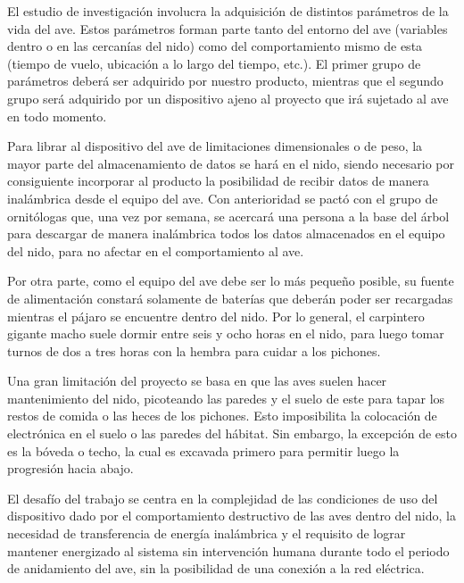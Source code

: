 El estudio de investigación involucra la adquisición de distintos parámetros de la vida del ave. Estos parámetros forman parte tanto del entorno del ave (variables dentro o en las cercanías del nido) como del comportamiento mismo de esta (tiempo de vuelo, ubicación a lo largo del tiempo, etc.). El primer grupo de parámetros deberá ser adquirido por nuestro producto, mientras que el segundo grupo será adquirido por un dispositivo ajeno al proyecto que irá sujetado al ave en todo momento.

Para librar al dispositivo del ave de limitaciones dimensionales o de peso, la mayor parte del almacenamiento de datos se hará en el nido, siendo necesario por consiguiente incorporar al producto la posibilidad de recibir datos de manera inalámbrica desde el equipo del ave. Con anterioridad se pactó con el grupo de ornitólogas que, una vez por semana, se acercará una persona a la base del árbol para descargar de manera inalámbrica todos los datos almacenados en el equipo del nido, para no afectar en el comportamiento al ave.

Por otra parte, como el equipo del ave debe ser lo más pequeño posible, su fuente de alimentación constará solamente de baterías que deberán poder ser recargadas mientras el pájaro se encuentre dentro del nido. Por lo general, el carpintero gigante macho suele dormir entre seis y ocho horas en el nido, para luego tomar turnos de dos a tres horas con la hembra para cuidar a los pichones.

Una gran limitación del proyecto se basa en que las aves suelen hacer mantenimiento del nido, picoteando las paredes y el suelo de este para tapar los restos de comida o las heces de los pichones. Esto imposibilita la colocación de electrónica en el suelo o las paredes del hábitat. Sin embargo, la excepción de esto es la bóveda o techo, la cual es excavada primero para permitir luego la progresión hacia abajo.

El desafío del trabajo se centra en la complejidad de las condiciones de uso del dispositivo dado por el comportamiento destructivo de las aves dentro del nido, la necesidad de transferencia de energía inalámbrica y el requisito de lograr mantener energizado al sistema sin intervención humana durante todo el periodo de anidamiento del ave, sin la posibilidad de una conexión a la red eléctrica. 